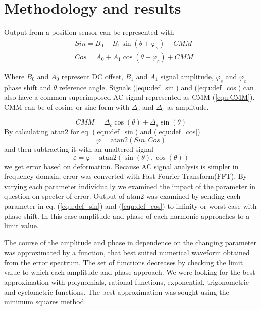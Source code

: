 \documentclass[a4paper]{article}
\begin{document}
\section{Methodology and results}
Output from a position sensor can be represented with
\begin{eqnarray}
\label{equ:def_sin}
&Sin = B_{0} + B_1 \sin(\theta + \varphi_{s}) + CMM\\
\label{equ:def_cos}
&Cos = A_{0} + A_1 \cos(\theta + \varphi_{c}) + CMM
\end{eqnarray}

Where $B_0$ and $A_0$ represent DC offset, $B_1$ and $A_1$ signal amplitude, $\varphi_s$ and $\varphi_c$  phase shift and $\theta$ reference angle. Signals (\ref{equ:def_sin}) and (\ref{equ:def_cos}) can also have a common superimposed AC signal  represented as CMM (\ref{equ:CMM}). CMM can be of cosine or sine form with $\Delta_c$ and $\Delta_s$ as amplitude.

\begin{equation}
\label{equ:CMM}
CMM = \Delta_c \cos(\theta)+\Delta_s \sin(\theta)
\end{equation}
By calculating atan2 for eq. (\ref{equ:def_sin}) and (\ref{equ:def_cos})
\begin{equation}
\label{equ:def_kot}
\varphi = \mathrm{atan2}(Sin,Cos)
\end{equation}
and then subtracting it with an unaltered signal
\begin{equation}
\label{equ:def_err}
\varepsilon =\varphi - \mathrm{atan2}(\sin(\theta),\cos(\theta))
\end{equation}
we get error based on deformation. Because  AC signal analysis is simpler in frequency domain, error was converted with Fast Fourier Transform(FFT). By varying each parameter individually we examined the impact of the parameter in question on specter of error. Output of atan2 was examined by sending each parameter in eq. (\ref{equ:def_sin}) and (\ref{equ:def_cos}) to infinity or worst case with phase shift.
In this case amplitude and phase of each harmonic approaches to a limit value.

The course of the amplitude and phase in dependence on the changing parameter was approximated by a function, that best suited numerical waveform obtained from the error spectrum. The set of functions decreases by checking the limit value to which each amplitude and phase approach. We were looking for the best approximation with polynomials, rational functions, exponential, trigonometric and cyclometric functions. The best approximation was sought using the minimum squares method.
\end{document}
